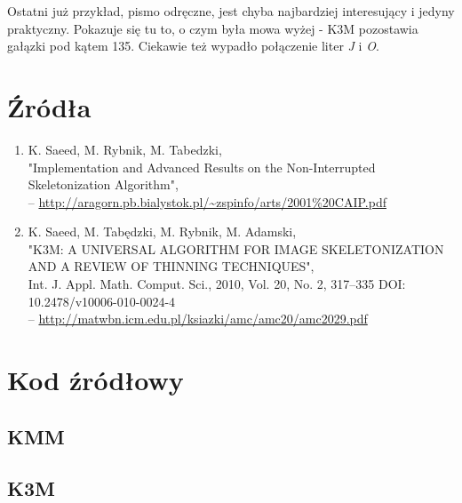 \documentclass[11pt]{article}
\begin{document}
\par
Ostatni już przykład, pismo odręczne, jest chyba najbardziej interesujący i jedyny praktyczny. Pokazuje się tu to, o czym była mowa wyżej - K3M pozostawia gałązki pod kątem 135\degree. Ciekawie też wypadło połączenie liter \textit{J} i \textit{O}.

\section{Źródła}
\begin{enumerate}
\item K. Saeed, M. Rybnik, M. Tabedzki, \\ "Implementation and Advanced Results 
on the Non-Interrupted Skeletonization Algorithm", \\  -- \url{http://aragorn.pb.bialystok.pl/~zspinfo/arts/2001\%20CAIP.pdf}
\item K. Saeed, M. Tabędzki, M. Rybnik, M. Adamski, \\ "K3M: A UNIVERSAL ALGORITHM FOR IMAGE SKELETONIZATION AND A REVIEW OF THINNING TECHNIQUES", \\ Int. J. Appl. Math. Comput. Sci., 2010, Vol. 20, No. 2, 317–335
DOI: 10.2478/v10006-010-0024-4 \\ -- \url{http://matwbn.icm.edu.pl/ksiazki/amc/amc20/amc2029.pdf}
\end{enumerate}

\section{Kod źródłowy}

\subsection{KMM}
\centering



\subsection{K3M}
\centering

\end{document}
